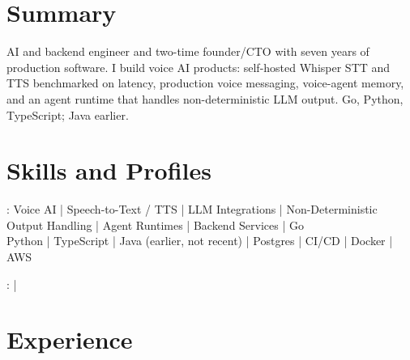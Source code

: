 \documentclass[print]{jack-resume}
\begin{document}
\pagecolor{darkmodeBackground}


\begin{minipage}[t][1cm][t]{.03\textwidth}
    \hfill
\end{minipage}

\section{Summary}
AI and backend engineer and two-time founder/CTO with seven years of production software. I build voice AI products: self-hosted Whisper STT and TTS benchmarked on latency, production voice messaging, voice-agent memory, and an agent runtime that handles non-deterministic LLM output. Go, Python, TypeScript; Java earlier.
\sectionsep

\section{Skills and Profiles}
:
Voice AI \hfill | \hfill
Speech-to-Text / TTS \hfill | \hfill
LLM Integrations \hfill | \hfill
Non-Deterministic Output Handling \hfill | \hfill
Agent Runtimes \hfill | \hfill
Backend Services \hfill | \hfill
Go \\
\hspace{1.0cm} Python \hfill | \hfill
TypeScript \hfill | \hfill
Java (earlier, not recent) \hfill | \hfill
Postgres \hfill | \hfill
CI/CD \hfill | \hfill
Docker \hfill | \hfill
AWS \\

\raggedright{
    :
      \href{https://www.linkedin.com/in/jack-sturtevant/}{ \ExternalLink} |
     \href{https://github.com/jacksturt}{ \ExternalLink}}

\section{Experience}
\end{document}
